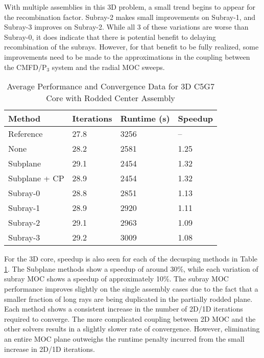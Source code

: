 With multiple assemblies in this 3D problem, a small trend begins to appear for the recombination factor.  Subray-2 makes small improvements on Subray-1, and Subray-3 improves on Subray-2.  While all 3 of these variations are worse than Subray-0, it does indicate that there is potential benefit to delaying recombination of the subrays.  However, for that benefit to be fully realized, some improvements need to be made to the approximations in the coupling between the CMFD/P$_3$ system and the radial MOC sweeps.

\begin{table}[h]
    \centering
    \caption[3D C5G7 Core with Rodded Center Assembly Performance]{Average Performance and Convergence Data for 3D C5G7 Core with Rodded Center  Assembly}\label{t:subray-performance-3Dcore-center}
    \begin{tabular}{l l l l}\toprule
        Method & Iterations & Runtime (s) & Speedup \\\midrule
        Reference     & 27.8 & 3256 & -- \\
        None          & 28.2 & 2581 & 1.25 \\
        Subplane      & 29.1 & 2454 & 1.32 \\
        Subplane + CP & 28.9 & 2454 & 1.32 \\
        Subray-0      & 28.8 & 2851 & 1.13 \\
        Subray-1      & 28.9 & 2920 & 1.11 \\
        Subray-2      & 29.1 & 2963 & 1.09 \\
        Subray-3      & 29.2 & 3009 & 1.08 \\
        \bottomrule
    \end{tabular}
\end{table}

For the 3D core, speedup is also seen for each of the decusping methods in Table \ref{t:subray-performance-3Dcore-center}.  The Subplane methods show a speedup of around 30\%, while each variation of subray MOC shows a speedup of approximately 10\%.  The subray MOC performance improves slightly on the single assembly cases due to the fact that a smaller fraction of long rays are being duplicated in the partially rodded plane.  Each method shows a consistent increase in the number of 2D/1D iterations required to converge.  The more complicated coupling between 2D MOC and the other solvers results in a slightly slower rate of convergence.  However, eliminating an entire MOC plane outweighs the runtime penalty incurred from the small increase in 2D/1D iterations.

